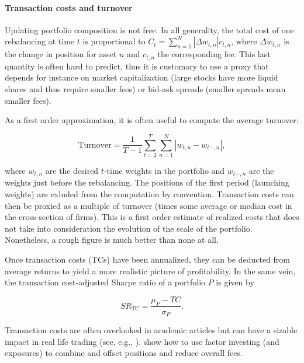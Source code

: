 \paragraph{Transaction costs and turnover}

Updating portfolio composition is not free. In all generality, the total cost of one rebalancing at time $t$ is proportional to $C_t=\sum_{n=1}^N | \Delta w_{t,n}|c_{t,n}$, where $\Delta w_{t,n}$ is the change in position for asset $n$ and $c_{t,n}$ the corresponding fee. This last quantity is often hard to predict, thus it is customary to use a proxy that depends for instance on market capitalization (large stocks have more liquid shares and thus require smaller fees) or bid-ask spreads (smaller spreads mean smaller fees).

As a first order approximation, it is often useful to compute the average turnover:

\begin{equation}
\text{Turnover}=\frac{1}{T-1}\sum_{t=2}^T\sum_{n=1}^N|w_{t,n}-w_{t-,n}|,
\end{equation}

where $w_{t,n}$ are the desired $t$-time weights in the portfolio and $w_{t -,n}$ are the weights just before the rebalancing. The positions of the first period (launching weights) are exluded from the computation by convention. Transaction costs can then be proxied as a multiple of turnover (times some average or median cost in the cross-section of firms). This is a first order estimate of realized costs that does not take into consideration the evolution of the scale of the portfolio. Nonetheless, a rough figure is much better than none at all.

Once transaction costs (TCs) have been annualized, they can be deducted from average returns to yield a more realistic picture of profitability. In the same vein, the transaction cost-adjusted Sharpe ratio of a portfolio $P$ is given by

\begin{equation}
\label{eq:SRTC}
SR_{TC}=\frac{\mu_P-TC}{\sigma_P}.
\end{equation}

Transaction costs are often overlooked in academic articles but can have a sizable impact in real life trading (see, e.g., \cite{novy2015taxonomy}). \cite{martin2018transaction} show how to use factor investing (and exposures) to combine and offset positions and reduce overall fees.

